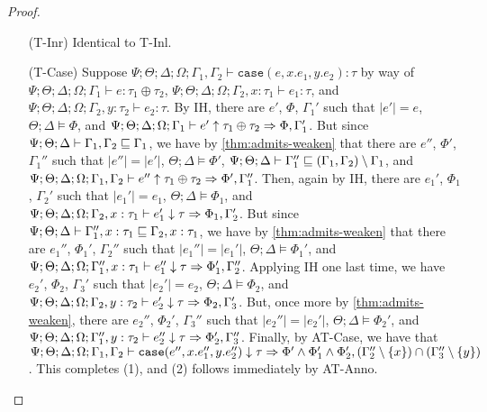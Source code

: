 \begin{proof}
\begin{itemize}
  
  \item[(T-Inr)] Identical to T-Inl.
  \item[(T-Case)] Suppose
  $\Psi ; \Theta ; \Delta ; \Omega ; \Gamma_1,\Gamma_2 \vdash \texttt{case}(e,x.e_1,y.e_2) : \tau$ by way of
  $\Psi ; \Theta ; \Delta ; \Omega ; \Gamma_1 \vdash e : \tau_1 \oplus \tau_2$,
  $\Psi ; \Theta ; \Delta ; \Omega ; \Gamma_2, x: \tau_1 \vdash e_1 : \tau$, and
  $\Psi ; \Theta ; \Delta ; \Omega ; \Gamma_2, y: \tau_2 \vdash e_2 : \tau$.
  By IH, there are $e'$, $\Phi$, $\Gamma_1'$ such that
  $|e'| = e$,
  $\Theta ; \Delta \vDash \Phi$, and
  $\Psi ; \Theta ; \Delta ; \Omega ; \Gamma_1 \vdash e' \uparrow \tau_1 \oplus \tau_2 \Rightarrow \Phi,\Gamma_1'$.
  But since $\Psi ; \Theta ; \Delta \vdash \Gamma_1,\Gamma_2 \sqsubseteq \Gamma_1$, we have by \autoref{thm:admits-weaken}
  that there are $e''$, $\Phi'$, $\Gamma_1''$ such that
  $|e''| = |e'|$,
  $\Theta ; \Delta \vDash \Phi'$,
  $\Psi ; \Theta ; \Delta \vdash \Gamma_1'' \sqsubseteq (\Gamma_1,\Gamma_2) \setminus \Gamma_1$, and
  $\Psi ; \Theta ; \Delta ; \Omega ; \Gamma_1,\Gamma_2 \vdash e'' \uparrow \tau_1 \oplus \tau_2 \Rightarrow \Phi',\Gamma_1''$.
  Then, again by IH, there are $e_1'$, $\Phi_1$, $\Gamma_2'$ such that
  $|e_1'| = e_1$,
  $\Theta ; \Delta \vDash \Phi_1$, and
  $\Psi ; \Theta ; \Delta ; \Omega ; \Gamma_2, x : \tau_1 \vdash e_1' \downarrow \tau \Rightarrow \Phi_1,\Gamma_2'$.
  But since
  $\Psi ; \Theta ; \Delta \vdash \Gamma_1'', x : \tau_1 \sqsubseteq \Gamma_2, x : \tau_1$,
  we have by \autoref{thm:admits-weaken} that there are $e_1''$, $\Phi_1'$, $\Gamma_2''$ such that
  $|e_1''| = |e_1'|$,
  $\Theta ; \Delta \vDash \Phi_1'$, and
  $\Psi ; \Theta ; \Delta ; \Omega ; \Gamma_1'', x : \tau_1 \vdash e_1'' \downarrow \tau \Rightarrow \Phi_1',\Gamma_2''$.
  Applying IH one last time, we have $e_2'$, $\Phi_2$, $\Gamma_3'$ such that
  $|e_2'| = e_2$,
  $\Theta ; \Delta \vDash \Phi_2$, and
  $\Psi ; \Theta ; \Delta ; \Omega ; \Gamma_2, y : \tau_2 \vdash e_2' \downarrow \tau \Rightarrow \Phi_2,\Gamma_3'$.
  But, once more by \autoref{thm:admits-weaken}, there are $e_2''$, $\Phi_2'$, $\Gamma_3''$ such that
  $|e_2''| = |e_2'|$,
  $\Theta ; \Delta \vDash \Phi_2'$, and
  $\Psi ; \Theta ; \Delta ; \Omega ; \Gamma_1'', y : \tau_2 \vdash e_2'' \downarrow \tau \Rightarrow \Phi_2',\Gamma_3''$.
  Finally, by AT-Case, we have that
  $\Psi ; \Theta ; \Delta ; \Omega ; \Gamma_1,\Gamma_2 \vdash \texttt{case}(e'',x.e_1'',y.e_2'') \downarrow \tau \Rightarrow \Phi' \wedge \Phi_1' \wedge \Phi_2',(\Gamma_2'' \setminus \{x\}) \cap (\Gamma_3'' \setminus \{y\})$.
  This completes (1), and (2) follows immediately by AT-Anno.
  

\end{itemize}
\end{proof}
